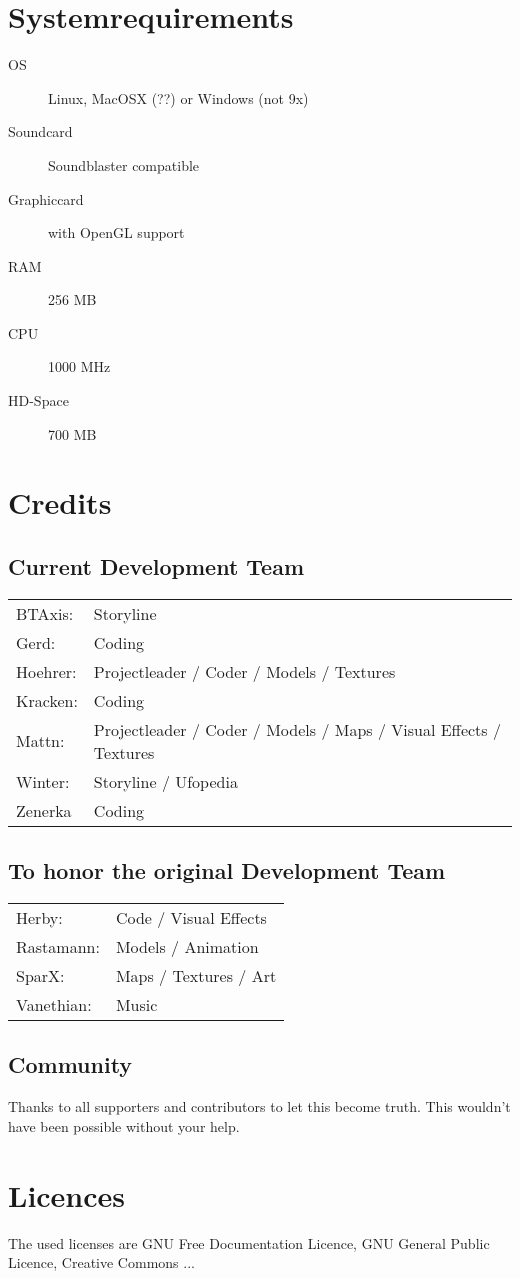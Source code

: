 \section{Systemrequirements}

\begin{description}
\item[OS] Linux, MacOSX (??) or Windows (not 9x)
\item[Soundcard] Soundblaster compatible
\item[Graphiccard] with OpenGL support
\item[RAM] 256 MB
\item[CPU] 1000 MHz
\item[HD-Space] 700 MB
\end{description}

\section{Credits}

\subsection{Current Development Team}
\begin{tabular}{ll}
BTAxis:  	&	Storyline \\
Gerd:		&	Coding \\
Hoehrer:  	&	Projectleader / Coder / Models / Textures \\
Kracken:	&	Coding \\
Mattn:  	&	Projectleader / Coder / Models / Maps / Visual Effects / Textures \\
Winter:		&	Storyline / Ufopedia \\
Zenerka		&	Coding
\end{tabular} 

\subsection{To honor the original Development Team}
\begin{tabular}{ll}
Herby:  	&	Code / Visual Effects\\ 
Rastamann:	&	Models / Animation\\ 
SparX:  	&	Maps / Textures / Art\\ 
Vanethian:  &	Music\\ 
\end{tabular} 

\subsection{Community}
Thanks to all supporters and contributors to let this become truth. This wouldn't have been possible without your help.

\section{Licences}
The used licenses are GNU Free Documentation Licence, GNU General Public Licence, Creative Commons ...

